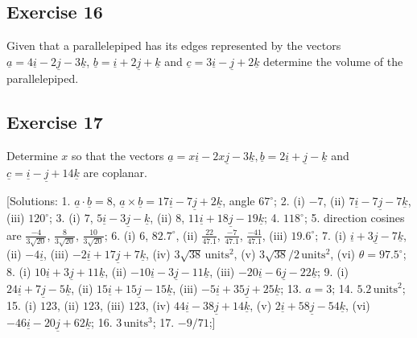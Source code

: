 \documentclass[
  11pt,
  oneside]{book}
\newcommand{\slide}{}
\theoremstyle{definition}
\theoremstyle{definition}
\theoremstyle{definition}
\theoremstyle{definition}
\theoremstyle{remark}
\begin{document}
\slide

\subsection*{Exercise 16}\label{exercise-16}

Given that a parallelepiped has its edges represented by the vectors \(\underline{a} = 4\underline{i} - 2\underline{j} - 3\underline{k}\), \(\underline{b} = \underline{i} + 2\underline{j} + \underline{k}\) and \(\underline{c} = 3\underline{i} - \underline{j} + 2\underline{k}\) determine the volume of the parallelepiped.

\slide

\subsection*{Exercise 17}\label{exercise-17}

Determine \(x\) so that the vectors \(\underline{a} = x\underline{i} - 2x\underline{j} - 3\underline{k}, \underline{b} =2 \underline{i} + \underline{j} - \underline{k}\) and \(\underline{c} = \underline{i} - \underline{j} + 14\underline{k}\) are coplanar.

{[}Solutions:
1. \(\underline{a}\cdot\underline{b}=8\), \(\underline{a}\times\underline{b} = 17\underline{i}-7\underline{j}+2\underline{k}\), angle \(67^{\circ}\);
2. (i) \(-7\), (ii) \(7\underline{i}-7\underline{j}-7\underline{k}\), (iii) \(120^{\circ}\);
3. (i) \(7\), \(5\underline{i}-3\underline{j}-\underline{k}\), (ii) \(8\), \(11\underline{i}+18\underline{j}-19\underline{k}\);
4. \(118^{\circ}\);
5. direction cosines are \(\frac{-4}{3\sqrt{20}}\), \(\frac{8}{3\sqrt{20}}\), \(\frac{10}{3\sqrt{20}}\);
6. (i) \(6\), \(82.7^{\circ}\), (ii) \(\frac{22}{47.1}\), \(\frac{-7}{47.1}\), \(\frac{-41}{47.1}\), (iii) \(19.6^{\circ}\);
7. (i) \(\underline{i}+3\underline{j}-7\underline{k}\), (ii) \(-4\underline{i}\), (iii) \(-2\underline{i}+17\underline{j}+7\underline{k}\), (iv) \(3\sqrt{38}\,\text{units}^2\), (v) \(3\sqrt{38}/2\,\text{units}^2\), (vi) \(\theta=97.5^{\circ}\);
8. (i) \(10\underline{i}+3\underline{j}+11\underline{k}\), (ii) \(-10\underline{i}-3\underline{j}-11\underline{k}\), (iii) \(-20\underline{i}-6\underline{j}-22\underline{k}\);
9. (i) \(24\underline{i}+7\underline{j}-5\underline{k}\), (ii) \(15\underline{i}+15\underline{j}-15\underline{k}\), (iii) \(-5\underline{i}+35\underline{j}+25\underline{k}\);
13. \(a=3\);
14. \(5.2\,\text{units}^2\);
15. (i) \(123\), (ii) \(123\), (iii) \(123\), (iv) \(44\underline{i}-38\underline{j}+14\underline{k}\), (v) \(2\underline{i}+58\underline{j}-54\underline{k}\), (vi) \(-46\underline{i} -20\underline{j}+62\underline{k}\);
16. \(3\,\text{units}^3\);
17. \(-9/71\);{]}

\cleardoublepage
{}
\printindex
\end{document}
